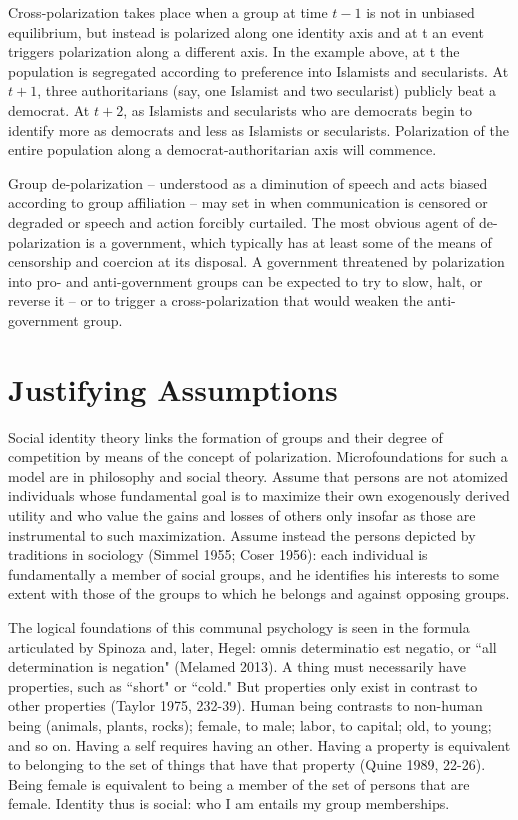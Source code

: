 \documentclass[12pt]{article}
\begin{document}
Cross-polarization takes place when a group at time $t-1$ is not in unbiased equilibrium, but instead is polarized along one identity axis and at t an event triggers polarization along a different axis.  In the example above, at t the population is segregated according to preference into Islamists and secularists.  At $t+1$, three authoritarians (say, one Islamist and two secularist) publicly beat a democrat.  At $t+2$, as Islamists and secularists who are democrats begin to identify more as democrats and less as Islamists or secularists.  Polarization of the entire population along a democrat-authoritarian axis will commence.

Group de-polarization – understood as a diminution of speech and acts biased according to group affiliation – may set in when communication is censored or degraded or speech and action forcibly curtailed.  The most obvious agent of de-polarization is a government, which typically has at least some of the means of censorship and coercion at its disposal.  A government threatened by polarization into pro- and anti-government groups can be expected to try to slow, halt, or reverse it – or to trigger a cross-polarization that would weaken the anti-government group.  

\section*{Justifying Assumptions}
Social identity theory links the formation of groups and their degree of competition by means of the concept of polarization.  Microfoundations for such a model are in philosophy and social theory.  Assume that persons are not atomized individuals whose fundamental goal is to maximize their own exogenously derived utility and who value the gains and losses of others only insofar as those are instrumental to such maximization.  Assume instead the persons depicted by traditions in sociology (Simmel 1955; Coser 1956):  each individual is fundamentally a member of social groups, and he identifies his interests to some extent with those of the groups to which he belongs and against opposing groups.

The logical foundations of this communal psychology is seen in the formula articulated by Spinoza and, later, Hegel:  omnis determinatio est negatio, or ``all determination is negation" (Melamed 2013).  A thing must necessarily have properties, such as ``short" or ``cold."  But properties only exist in contrast to other properties (Taylor 1975, 232-39).  Human being contrasts to non-human being (animals, plants, rocks); female, to male; labor, to capital; old, to young; and so on.  Having a self requires having an other.   Having a property is equivalent to belonging to the set of things that have that property (Quine 1989, 22-26).  Being female is equivalent to being a member of the set of persons that are female.  Identity thus is social:  who I am entails my group memberships.
\end{document}
